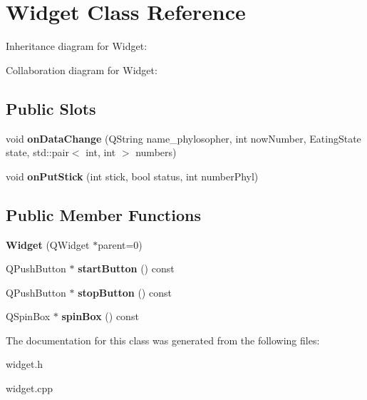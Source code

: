 \hypertarget{classWidget}{}\section{Widget Class Reference}
\label{classWidget}


Inheritance diagram for Widget\+:


Collaboration diagram for Widget\+:
\subsection*{Public Slots}
\begin{DoxyCompactItemize}
\item 
\mbox{\label{classWidget_a16e625b4b1f238a096d2e245b2e4ee2b}} 
void {\bfseries on\+Data\+Change} (Q\+String name\+\_\+phylosopher, int now\+Number, Eating\+State state, std\+::pair$<$ int, int $>$ numbers)
\item 
\mbox{\label{classWidget_a806c9ef6bb1ab72d4de16bac94ee323d}} 
void {\bfseries on\+Put\+Stick} (int stick, bool status, int number\+Phyl)
\end{DoxyCompactItemize}
\subsection*{Public Member Functions}
\begin{DoxyCompactItemize}
\item 
\mbox{\label{classWidget_a29531c7f141e461322981b3b579d4590}} 
{\bfseries Widget} (Q\+Widget $\ast$parent=0)
\item 
\mbox{\label{classWidget_a598fb349d1c77107a978c762badb74bd}} 
Q\+Push\+Button $\ast$ {\bfseries start\+Button} () const
\item 
\mbox{\label{classWidget_a0c26625361114d8354ac3e42277c9ad7}} 
Q\+Push\+Button $\ast$ {\bfseries stop\+Button} () const
\item 
\mbox{\label{classWidget_a97e64a57c7b339f530ea5a80fe56a029}} 
Q\+Spin\+Box $\ast$ {\bfseries spin\+Box} () const
\end{DoxyCompactItemize}


The documentation for this class was generated from the following files\+:\begin{DoxyCompactItemize}
\item 
widget.\+h\item 
widget.\+cpp\end{DoxyCompactItemize}

